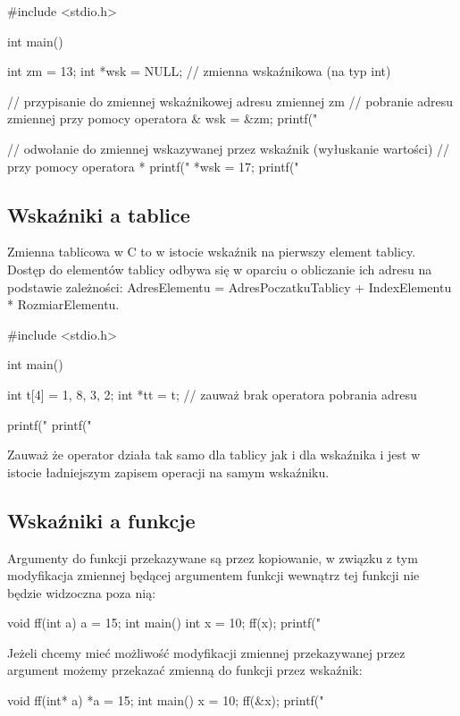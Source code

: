 \begin{CodeFrame*}[c]{}
#include <stdio.h>

int main() {
    int zm = 13;
    int *wsk = NULL; // zmienna wskaźnikowa (na typ int)
    
    // przypisanie do zmiennej wskaźnikowej adresu zmiennej zm
    // pobranie adresu zmiennej przy pomocy operatora &
    wsk = &zm;
    printf("%
    
    // odwołanie do zmiennej wskazywanej przez wskaźnik (wyłuskanie wartości)
    // przy pomocy operatora *
    printf("%
    *wsk = 17;
    printf("%
}
\end{CodeFrame*}

\subsection{Wskaźniki a tablice}

Zmienna tablicowa w C to w istocie wskaźnik na pierwszy element tablicy.
Dostęp do elementów tablicy odbywa się w oparciu o obliczanie ich adresu na podstawie zależności: AdresElementu = AdresPoczatkuTablicy + IndexElementu * RozmiarElementu.

\begin{CodeFrame*}[c]{}
#include <stdio.h>

int main() {
  int t[4] = {1, 8, 3, 2};
  int *tt = t; // zauważ brak operatora pobrania adresu
  
  printf("%
  printf("%
}
\end{CodeFrame*}

Zauważ że operator  działa tak samo dla tablicy jak i dla wskaźnika i jest w istocie ładniejszym zapisem operacji  na samym wskaźniku.

\subsection{Wskaźniki a funkcje}
Argumenty do funkcji przekazywane są przez kopiowanie, w związku z tym modyfikacja zmiennej będącej argumentem funkcji wewnątrz tej funkcji nie będzie widzoczna poza nią:
\begin{CodeFrame*}[c]{}
void ff(int a) {
    a = 15;
}
int main() {
    int x = 10;
    ff(x);
    printf("%
}
\end{CodeFrame*}

Jeżeli chcemy mieć możliwość modyfikacji zmiennej przekazywanej przez argument możemy przekazać zmienną do funkcji przez wskaźnik:
\begin{CodeFrame*}[c]{}
void ff(int* a) {
    *a = 15;
}
int main() {
    x = 10;
    ff(&x);
    printf("%
}
\end{CodeFrame*}

